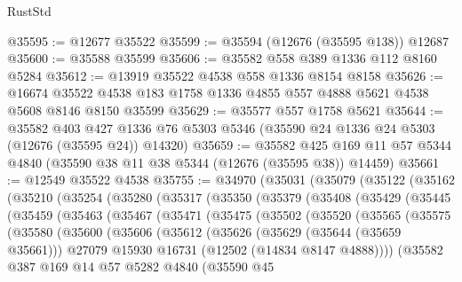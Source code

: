\begin{lexlean}{RustStd}
\begin{coremodule}
@35595 := @12677 @35522
@35599 := @35594 (@12676 (@35595 @138)) @12687
@35600 := @35588 @35599
@35606 := @35582 @558 @389 @1336 @112 @8160 @5284
@35612 := @13919 @35522 @4538 @558 @1336 @8154 @8158
@35626 := @16674 @35522 @4538 @183 @1758 @1336 @4855 @557 @4888 @5621 @4538 @5608 @8146 @8150 @35599
@35629 := @35577 @557 @1758 @5621
@35644 := @35582
    @403
    @427
    @1336
    @76
    @5303
    @5346
    (@35590 @24 @1336 @24 @5303 (@12676 (@35595 @24)) @14320)
@35659 := @35582
    @425
    @169
    @11
    @57
    @5344
    @4840
    (@35590 @38 @11 @38 @5344 (@12676 (@35595 @38)) @14459)
@35661 := @12549 @35522 @4538
@35755 := @34970
    (@35031
      (@35079
        (@35122
          (@35162
            (@35210
              (@35254
                (@35280
                  (@35317
                    (@35350
                      (@35379
                        (@35408
                          (@35429
                            (@35445
                              (@35459
                                (@35463
                                  (@35467
                                    (@35471
                                      (@35475
                                        (@35502
                                          (@35520
                                            (@35565
                                              (@35575
                                                (@35580
                                                  (@35600
                                                    (@35606
                                                      (@35612
                                                        (@35626
                                                          (@35629 (@35644 (@35659 @35661)))
                                                          @27079
                                                          @15930
                                                          @16731
                                                          (@12502 (@14834 @8147 @4888))))
                                                      (@35582
                                                        @387
                                                        @169
                                                        @14
                                                        @57
                                                        @5282
                                                        @4840
                                                        (@35590
                                                          @45

\end{coremodule}
\end{lexlean}
